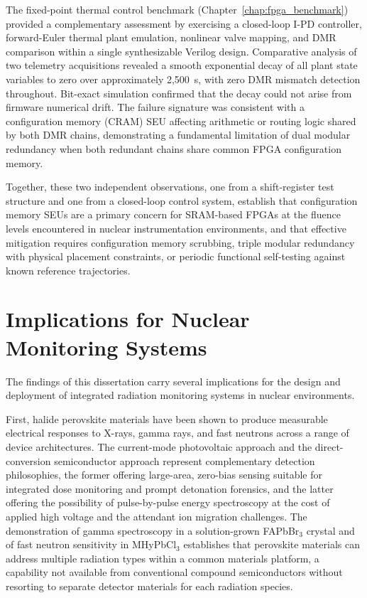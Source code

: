 The fixed-point thermal control benchmark
(Chapter~\ref{chap:fpga_benchmark}) provided a complementary
assessment by exercising a closed-loop I-PD controller, forward-Euler
thermal plant emulation, nonlinear valve mapping, and DMR comparison
within a single synthesizable Verilog design.  Comparative analysis
of two telemetry acquisitions revealed a smooth exponential decay of
all plant state variables to zero over approximately 2,500~s, with
zero DMR mismatch detection throughout.  Bit-exact simulation
confirmed that the decay could not arise from firmware numerical
drift.  The failure signature was consistent with a configuration
memory (CRAM) SEU affecting arithmetic or routing logic shared by
both DMR chains, demonstrating a fundamental limitation of dual
modular redundancy when both redundant chains share common FPGA
configuration memory.

Together, these two independent observations, one from a
shift-register test structure and one from a closed-loop control
system, establish that configuration memory SEUs are a primary
concern for SRAM-based FPGAs at the fluence levels encountered in
nuclear instrumentation environments, and that effective mitigation
requires configuration memory scrubbing, triple modular redundancy
with physical placement constraints, or periodic functional
self-testing against known reference trajectories.


\section{Implications for Nuclear Monitoring Systems}
\label{sec:conc_implications}

The findings of this dissertation carry several implications for the
design and deployment of integrated radiation monitoring systems in
nuclear environments.

First, halide perovskite materials have been shown to produce
measurable electrical responses to X-rays, gamma rays, and fast
neutrons across a range of device architectures.  The
current-mode photovoltaic approach and the direct-conversion
semiconductor approach represent complementary detection
philosophies, the former offering large-area, zero-bias sensing
suitable for integrated dose monitoring and prompt detonation
forensics, and the latter offering the possibility of pulse-by-pulse
energy spectroscopy at the cost of applied high voltage and the
attendant ion migration challenges.  The demonstration of gamma
spectroscopy in a solution-grown FAPbBr$_3$ crystal and of fast
neutron sensitivity in MHyPbCl$_3$ establishes that perovskite
materials can address multiple radiation types within a common
materials platform, a capability not available from conventional
compound semiconductors without resorting to separate detector
materials for each radiation species.


